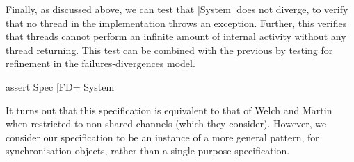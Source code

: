 Finally, as discussed above, we can test that |System| does not diverge, to
verify that no thread in the implementation throws an exception.  Further,
this verifies that threads cannot perform an infinite amount of internal
activity without any thread returning.  This test can be combined with the
previous by testing for refinement in the failures-divergences model.
%
\begin{cspm}
assert Spec [FD= System
\end{cspm}

It turns out that this specification is equivalent to that of Welch and
Martin~\cite{welch-martin} when restricted to non-shared channels (which they
consider).  However, we consider our specification to be an instance of a more
general pattern, for synchronisation objects, rather than a single-purpose
specification.
